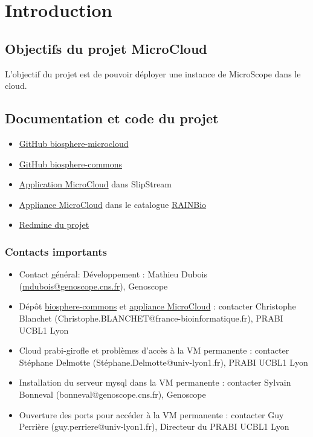 \section{Introduction}

\subsection{Objectifs du projet MicroCloud}

L'objectif du projet est de pouvoir déployer une instance de MicroScope dans le cloud.

\subsection{Documentation et code du projet}

\begin{itemize}
	\item \href{https://github.com/IFB-ElixirFr/biosphere-microcloud}{GitHub biosphere-microcloud}
	\item \href{https://github.com/IFB-ElixirFr/biosphere-commons}{GitHub biosphere-commons}
	\item \href{https://nuv.la/module/ifb/devzone/MicroCloud/}{Application MicroCloud} dans SlipStream
	\item \href{https://biosphere.france-bioinformatique.fr/catalogue/appliance/150/}{Appliance MicroCloud}
	dans le catalogue \href{https://biosphere.france-bioinformatique.fr/catalogue/}{RAINBio}
	\item \href{https://intranet.genoscope.cns.fr/agc/redmine/projects/microcloud}{Redmine du projet}\\
\end{itemize}

\subsubsection{Contacts importants}

\begin{itemize}
	\item Contact général: Développement : Mathieu Dubois (\href{mailto:mdubois@genoscope.cns.fr}{mdubois@genoscope.cns.fr}), Genoscope
	\item Dépôt \href{https://github.com/IFB-ElixirFr/biosphere-commons}{biosphere-commons} et \href{https://biosphere.france-bioinformatique.fr/catalogue/}{appliance MicroCloud} : contacter Christophe Blanchet (Christophe.BLANCHET@france-bioinformatique.fr), PRABI UCBL1 Lyon
	\item Cloud prabi-girofle et problèmes d'accès à la VM permanente : contacter Stéphane Delmotte (Stéphane.Delmotte@univ-lyon1.fr), PRABI UCBL1 Lyon
	\item Installation du serveur mysql dans la VM permanente : contacter Sylvain Bonneval (bonneval@genoscope.cns.fr), Genoscope
	\item Ouverture des ports pour accéder à la VM permanente : contacter Guy Perrière (guy.perriere@univ-lyon1.fr), Directeur du PRABI UCBL1 Lyon
\end{itemize}
